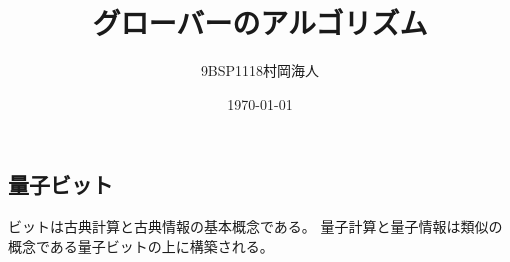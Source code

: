 \documentclass[platex,dvipdfmx]{jlreq}			%
\title{グローバーのアルゴリズム}
\author{9BSP1118村岡海人}
\date{\today}
\begin{document}
    \maketitle
    \subsection{量子ビット}
    ビットは古典計算と古典情報の基本概念である。
    量子計算と量子情報は類似の概念である量子ビットの上に構築される。
\end{document}

